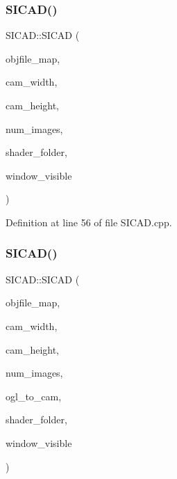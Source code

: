 \subsubsection{\texorpdfstring{S\+I\+C\+A\+D()}{SICAD()}\hspace{0.1cm}{\footnotesize\ttfamily [5/9]}}
{\footnotesize\ttfamily S\+I\+C\+A\+D\+::\+S\+I\+C\+AD (\begin{DoxyParamCaption}\item[{const \mbox{\hyperlink{classSICAD_a9e1e1460d4c0f331b4fd015aae4dd721}{Model\+Path\+Container}} \&}]{objfile\+\_\+map,  }\item[{const G\+Lsizei}]{cam\+\_\+width,  }\item[{const G\+Lsizei}]{cam\+\_\+height,  }\item[{const G\+Lint}]{num\+\_\+images,  }\item[{const std\+::string \&}]{shader\+\_\+folder,  }\item[{const bool}]{window\+\_\+visible }\end{DoxyParamCaption})}



Definition at line 56 of file S\+I\+C\+A\+D.\+cpp.

\mbox{\label{classSICAD_abcb9bb154f73472447affb9bb16dcec7}} 
\subsubsection{\texorpdfstring{S\+I\+C\+A\+D()}{SICAD()}\hspace{0.1cm}{\footnotesize\ttfamily [6/9]}}
{\footnotesize\ttfamily S\+I\+C\+A\+D\+::\+S\+I\+C\+AD (\begin{DoxyParamCaption}\item[{const \mbox{\hyperlink{classSICAD_a9e1e1460d4c0f331b4fd015aae4dd721}{Model\+Path\+Container}} \&}]{objfile\+\_\+map,  }\item[{const G\+Lsizei}]{cam\+\_\+width,  }\item[{const G\+Lsizei}]{cam\+\_\+height,  }\item[{const G\+Lint}]{num\+\_\+images,  }\item[{const std\+::vector$<$ float $>$ \&}]{ogl\+\_\+to\+\_\+cam,  }\item[{const std\+::string \&}]{shader\+\_\+folder,  }\item[{const bool}]{window\+\_\+visible }\end{DoxyParamCaption})}




